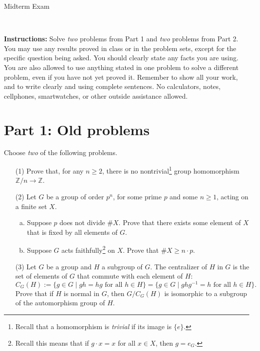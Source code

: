 \documentclass[11pt]{article}
\title{}
\date{\vspace{-0.5in}}
\newcommand{\Z}{\mathbb{Z}}
\theoremstyle{definition}
\begin{document}
\thispagestyle{fancy}
\pagestyle{fancy}

\vspace{3em}

\begin{center}
	{\LARGE Midterm Exam}
\end{center}

\

\noindent
{\bf Instructions:}
Solve \emph{two} problems from Part 1 and \emph{two} problems from Part 2. You may use any results proved in class or in the problem sets, except for the specific question being asked. You should clearly state any facts you are using. You are also allowed to use anything stated in
one problem to solve a different problem, even if you have not yet proved it. Remember to show
all your work, and to write clearly and using complete sentences. No calculators, notes, cellphones,
smartwatches, or other outside assistance allowed.

\section*{Part 1: Old problems}

Choose \emph{two} of the following problems.

\begin{enumerate}
 
 \item[(1)] Prove that, for any $n\geq 2$, there is no nontrivial\footnote{Recall that a homomorphism is \emph{trivial} if its image is $\{e\}$.} group homomorphism $\Z/n \to \Z$.
 
 
  \item[(2)] Let $G$ be a group of order $p^n$, for some prime $p$ and some $n\geq 1$, acting on a finite set $X$.
  \begin{enumerate}[(a)]
    \item Suppose $p$ does not divide $\# X$. Prove that there exists some element of $X$ that is fixed by all elements of $G$.
      \item Suppose $G$ acts faithfully\footnote{Recall this means that if $g \cdot x = x$ for all $x \in X$, then $g = e_G$.} on $X$.  Prove that $\# X \geq n \cdot p$.
            \end{enumerate}
            
            
 \item[(3)] Let $G$ be a group and $H$ a subgroup of $G$. The centralizer of $H$ in $G$ is the set of elements of $G$ that commute with each element of $H$:
  $$
  C_G(H) := \{g \in G \mid gh = hg \text{ for all $h \in H$} \} = \{g \in G \mid ghg^{-1} = h \text{ for all $h \in H$} \}.
  $$
  Prove that if $H$ is normal in $G$, then $G/C_G(H)$ is isomorphic to a subgroup of the automorphism group of $H$.
 
 


     
    


 \end{enumerate}
\end{document}

